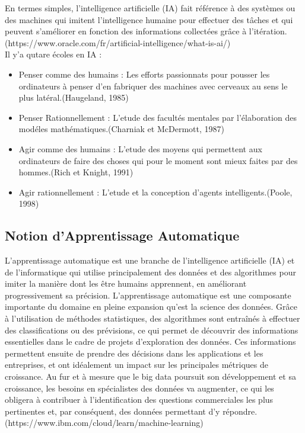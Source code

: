 \documentclass[12pt]{report}
\begin{document}
En termes simples, l'intelligence artificielle (IA) fait référence à des systèmes ou des machines qui imitent l'intelligence humaine pour effectuer des tâches et qui peuvent s'améliorer en fonction des informations collectées grâce à l'itération.\\
(https://www.oracle.com/fr/artificial-intelligence/what-is-ai/)\\

Il y'a qutare écoles en IA : 
\begin{itemize}
\item Penser comme des humains : Les efforts passionnats pour pousser les ordinateurs à penser d'en fabriquer des machines avec cerveaux au sens le plus latéral.(Haugeland, 1985)
\item Penser Rationnellement : L'etude des facultés mentales par l'élaboration des modéles mathématiques.(Charniak et McDermott, 1987)
\item Agir comme des humains : L'etude des moyens qui permettent aux ordinateurs de faire des choses qui pour le moment sont mieux faites par des hommes.(Rich et Knight, 1991)
\item Agir rationnellement : L'etude et la conception d'agents intelligents.(Poole, 1998)
\end{itemize}

\subsection{Notion d'Apprentissage Automatique}

L'apprentissage automatique est une branche de l'intelligence artificielle
(IA) et de l'informatique qui utilise principalement des données et des
algorithmes pour imiter la manière dont les être humains apprennent, en
améliorant progressivement sa précision.
L'apprentissage automatique est une composante importante du domaine
en pleine expansion qu'est la science des données. Grâce à l'utilisation de
méthodes statistiques, des algorithmes sont entraînés à effectuer des
classifications ou des prévisions, ce qui permet de découvrir des
informations essentielles dans le cadre de projets d'exploration des
données. Ces informations permettent ensuite de prendre des décisions
dans les applications et les entreprises, et ont idéalement un impact sur les
principales métriques de croissance. Au fur et à mesure que le big data
poursuit son développement et sa croissance, les besoins en spécialistes
des données va augmenter, ce qui les obligera à contribuer à l'identification
des questions commerciales les plus pertinentes et, par conséquent, des
données permettant d'y répondre.\\
(https://www.ibm.com/cloud/learn/machine-learning)
\end{document}
